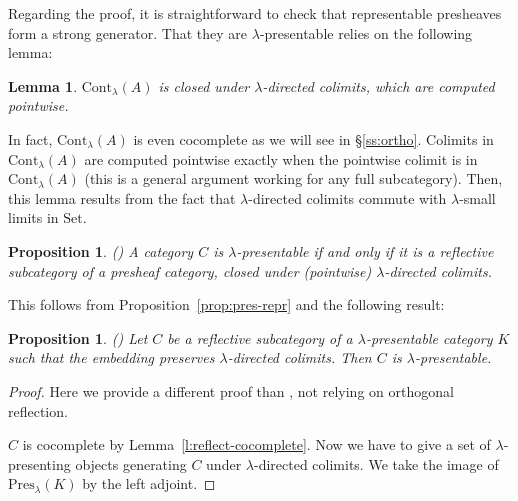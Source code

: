 \documentclass{article}
\newcommand{\Cont}[1]{\text{Cont}_{#1}}
\newcommand{\Pres}[1]{\text{Pres}_{#1}}
\newcommand{\Set}{\text{Set}}
\newtheorem{proposition}[theorem]{Proposition}
\newtheorem{lemma}[theorem]{Lemma}
\begin{document}
       Regarding the proof, it is straightforward to check that representable presheaves form a strong
       generator.
       That they are $\lambda$-presentable relies on the following lemma:
       \begin{lemma}
         \label{l:cont-lambda-directed-colim}
         $\Cont\lambda(A)$ is closed under $\lambda$-directed colimits, which
         are computed pointwise.
         \end{lemma}
         In fact, $\Cont\lambda(A)$ is even cocomplete as we will see in
         \S\ref{ss:ortho}. Colimits in
         $\Cont\lambda(A)$ are computed pointwise exactly when the pointwise colimit
         is in $\Cont\lambda(A)$ (this is a general argument working for any full subcategory).
         Then, this lemma results from
           the fact that $\lambda$-directed colimits commute with
           $\lambda$-small limits in $\Set$.
           \begin{proposition}
             (\cite[Representation Theorem 1.45]{adamek_rosicky})
             \label{proof:reflective-subcat-pres}
             A category $C$ is $\lambda$-presentable
             if and only if it is a reflective subcategory of a presheaf
             category, closed under (pointwise) $\lambda$-directed colimits.
           \end{proposition}
           This follows from Proposition~\ref{prop:pres-repr} and the following result:
           \begin{proposition}
              (\cite[Theorem 1.39]{adamek_rosicky})
              Let $C$ be a reflective subcategory of a $\lambda$-presentable category $K$ such
              that the embedding preserves $\lambda$-directed colimits.
              Then $C$ is $\lambda$-presentable.
           \end{proposition}
             \begin{proof}
               Here we provide a different proof than \cite{adamek_rosicky},
               not relying on orthogonal reflection.

               $C$ is cocomplete by Lemma~\ref{l:reflect-cocomplete}. Now we have
               to give a set of $\lambda$-presenting objects generating $C$
               under $\lambda$-directed colimits. We take
                the image of $\Pres\lambda(K)$ by the left adjoint.
           \end{proof}
   
\end{document}

